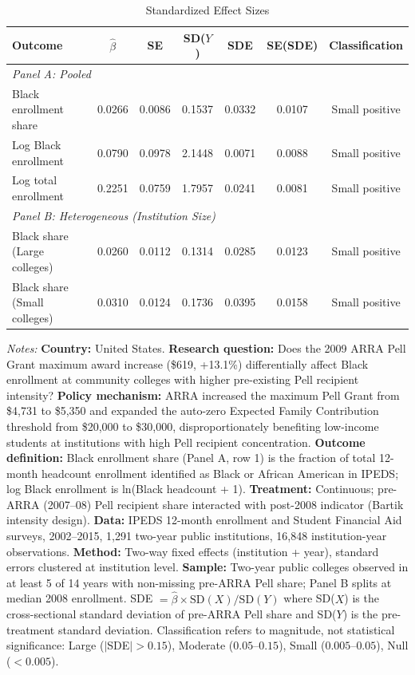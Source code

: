 \begin{table}[htbp]
\centering
\caption{Standardized Effect Sizes}
\label{tab:sde}
\small
\begin{tabular}{lcccccc}
\toprule
Outcome & $\hat{\beta}$ & SE & SD($Y$) & SDE & SE(SDE) & Classification \\
\midrule
\multicolumn{7}{l}{\textit{Panel A: Pooled}} \\
\midrule
Black enrollment share & 0.0266 & 0.0086 & 0.1537 & 0.0332 & 0.0107 & Small positive \\
Log Black enrollment & 0.0790 & 0.0978 & 2.1448 & 0.0071 & 0.0088 & Small positive \\
Log total enrollment & 0.2251 & 0.0759 & 1.7957 & 0.0241 & 0.0081 & Small positive \\
\midrule
\multicolumn{7}{l}{\textit{Panel B: Heterogeneous (Institution Size)}} \\
\midrule
Black share (Large colleges) & 0.0260 & 0.0112 & 0.1314 & 0.0285 & 0.0123 & Small positive \\
Black share (Small colleges) & 0.0310 & 0.0124 & 0.1736 & 0.0395 & 0.0158 & Small positive \\
\bottomrule
\end{tabular}
\par\vspace{0.5em}
\begin{minipage}{\textwidth}
\small
\textit{Notes:} \textbf{Country:} United States. \textbf{Research question:} Does the 2009 ARRA Pell Grant maximum award increase (\$619, +13.1\%) differentially affect Black enrollment at community colleges with higher pre-existing Pell recipient intensity? \textbf{Policy mechanism:} ARRA increased the maximum Pell Grant from \$4,731 to \$5,350 and expanded the auto-zero Expected Family Contribution threshold from \$20,000 to \$30,000, disproportionately benefiting low-income students at institutions with high Pell recipient concentration. \textbf{Outcome definition:} Black enrollment share (Panel A, row 1) is the fraction of total 12-month headcount enrollment identified as Black or African American in IPEDS; log Black enrollment is ln(Black headcount + 1). \textbf{Treatment:} Continuous; pre-ARRA (2007--08) Pell recipient share interacted with post-2008 indicator (Bartik intensity design). \textbf{Data:} IPEDS 12-month enrollment and Student Financial Aid surveys, 2002--2015, 1,291 two-year public institutions, 16,848 institution-year observations. \textbf{Method:} Two-way fixed effects (institution + year), standard errors clustered at institution level. \textbf{Sample:} Two-year public colleges observed in at least 5 of 14 years with non-missing pre-ARRA Pell share; Panel B splits at median 2008 enrollment. SDE $= \hat{\beta} \times \text{SD}(X) / \text{SD}(Y)$ where SD($X$) is the cross-sectional standard deviation of pre-ARRA Pell share and SD($Y$) is the pre-treatment standard deviation. Classification refers to magnitude, not statistical significance: Large ($|$SDE$| > 0.15$), Moderate ($0.05$--$0.15$), Small ($0.005$--$0.05$), Null ($< 0.005$).
\end{minipage}
\end{table}
